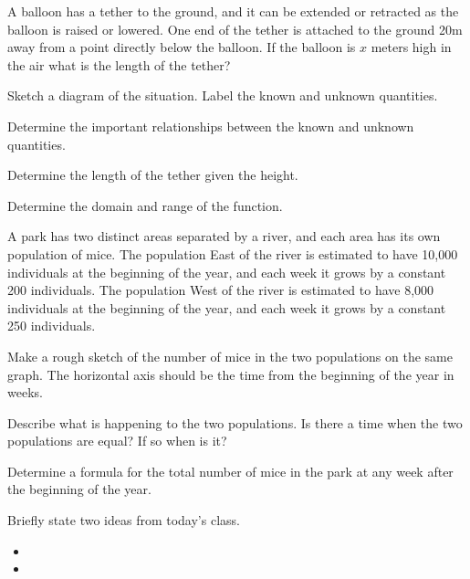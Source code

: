 \begin{problem}
\item A balloon has a tether to the ground, and it can be extended or
  retracted as the balloon is raised or lowered. One end of the tether
  is attached to the ground 20m away from a point directly below the
  balloon. If the balloon is $x$ meters high in the air what is the
  length of the tether?
  \begin{subproblem}
    \item Sketch a diagram of the situation. Label the known and
      unknown quantities.
      \vfill
      \vfill
    \item Determine the important relationships between the known and
      unknown quantities.
      \vfill
    \item Determine the length of the tether given the height.
      \vfill
    \item Determine the domain and range of the function.
      \vfill
  \end{subproblem}

  \clearpage

\item A park has two distinct areas separated by a river, and each
  area has its own population of mice.  The population East of the
  river is estimated to have 10,000 individuals at the beginning of
  the year, and each week it grows by a constant 200 individuals. The
  population West of the river is estimated to have 8,000 individuals
  at the beginning of the year, and each week it grows by a constant
  250 individuals.

  \begin{subproblem}
  \item Make a rough sketch of the number of mice in the two
    populations on the same graph. The horizontal axis should be the
    time from the beginning of the year in weeks.
    \vfill

  \item Describe what is happening to the two populations. Is there a
    time when the two populations are equal? If so when is it?
    \vfill

  \item Determine a formula for the total number of mice in the park
    at any week after the beginning of the year.
    \vfill
  \end{subproblem}

  
\end{problem}

\postClass

\begin{problem}
\item Briefly state two ideas from today's class.
  \begin{itemize}
  \item 
  \item 
  \end{itemize}
\item 
  \begin{subproblem}
    \item
  \end{subproblem}
\end{problem}



